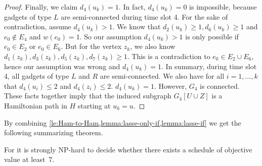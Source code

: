 \begin{proof}
Finally, we claim $d_4(u_k) = 1$. In fact, $d_4(u_k) = 0$ is impossible, because gadgets of type $L$ are semi-connected during time slot 4. For the sake of contradiction, assume $d_4(u_k) > 1$. We know that $d_2(u_k) \geq 1, d_6(u_k) \geq 1$ and $e_0 \not\in E_4$ and $w(e_0) = 1$. So our assumption $d_4(u_k) > 1$ is only possible if $e_0 \in E_2$ or $e_0 \in E_6$. But for the vertex $z_k$, we also know $d_1(z_k), d_3(z_k), d_5(z_k), d_7(z_k) \geq 1$. This is a contradiction to $e_0 \in E_2 \cup E_6$, hence our assumption was wrong and $d_4(u_k) = 1$.
In summary, during time slot 4, all gadgets of type $L$ and $R$ are semi-connected. We also have for all $i=1,\dots,k$ that $d_4(u_i) \leq 2$ and $d_4(z_i) \leq 2$.  $d_4(u_k) = 1$. However, $G_4$ is connected. These facts together imply that the induced subgraph $G_4[U \cup Z]$ is a Hamiltonian path in $H$ starting at $u_k = u$.
\end{proof}

By combining \cref{le:Ham-to-Ham,lemma:lasse-only-if,lemma:lasse-if} we get
the following summarizing theorem.
\begin{theorem}
\label{th:value=7}
For {\xxxNTP} it is strongly NP-hard to decide whether there exists a schedule
of objective value at least~$7$.
 
\end{theorem}

